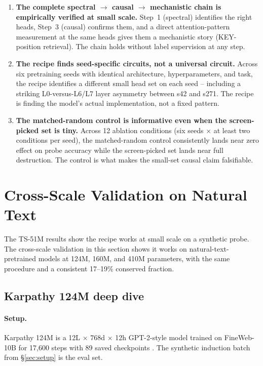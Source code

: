 \documentclass[11pt]{article}
\begin{document}
\begin{enumerate}[leftmargin=*,topsep=2pt,itemsep=2pt]
\item \textbf{The complete spectral $\to$ causal $\to$ mechanistic chain is empirically verified at small scale.} Step~1 (spectral) identifies the right heads, Step~3 (causal) confirms them, and a direct attention-pattern measurement at the same heads gives them a mechanistic story (KEY-position retrieval). The chain holds without label supervision at any step.

\item \textbf{The recipe finds seed-specific circuits, not a universal circuit.} Across six pretraining seeds with identical architecture, hyperparameters, and task, the recipe identifies a different small head set on each seed -- including a striking L0-versus-L6/L7 layer asymmetry between s42 and s271. The recipe is finding the model's actual implementation, not a fixed pattern.

\item \textbf{The matched-random control is informative even when the screen-picked set is tiny.} Across 12 ablation conditions (six seeds $\times$ at least two conditions per seed), the matched-random control consistently lands near zero effect on probe accuracy while the screen-picked set lands near full destruction. The control is what makes the small-set causal claim falsifiable.
\end{enumerate}

\section{Cross-Scale Validation on Natural Text}
\label{sec:cross_scale}

The TS-51M results show the recipe works at small scale on a synthetic probe. The cross-scale validation in this section shows it works on natural-text-pretrained models at 124M, 160M, and 410M parameters, with the same procedure and a consistent 17--19\% conserved fraction.

\subsection{Karpathy 124M deep dive}
\label{sec:karpathy}

\paragraph{Setup.} Karpathy 124M is a 12L $\times$ 768d $\times$ 12h GPT-2-style model trained on FineWeb-10B for 17,600 steps with 89 saved checkpoints \citep{karpathy2023nanogpt}. The synthetic induction batch from \S\ref{sec:setup} is the eval set.
\end{document}
